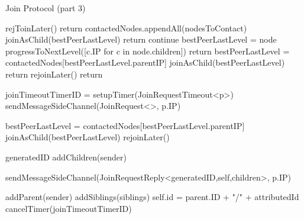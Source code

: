 \begin{algorithm}
\begin{algorithmic}[1]
\caption{Join Protocol (part 3)}
    
             
                \State rejToinLater()
                \State return
            \EndIf
        \EndIf
        \State contactedNodes.appendAll(nodesToContact)
                    \State joinAsChild(bestPeerLastLevel)
                    \State return
                \EndIf
            \EndIf
                \State continue 
            \EndIf
            \State bestPeerLastLevel = node
            \State progressToNextLevel([c.IP for c in node.children])
            \State return
                \State bestPeerLastLevel = contactedNodes[bestPeerLastLevel.parentIP]
                \State joinAsChild(bestPeerLastLevel)       
                \State return
            \Else
                \State rejoinLater()
                \State return
            \EndIf
        \EndFor
    \asdend
   
    \asdprocedure[joinAsChild(p)]
        \State joinTimeoutTimerID = setupTimer(JoinRequestTimeout<p>)
        \State sendMessageSideChannel(JoinRequest<>, p.IP)
    \asdend

    \asdupon[JoinRequestTimeout(p)]
            \State bestPeerLastLevel = contactedNodes[bestPeerLastLevel.parentIP]
            \State joinAsChild(bestPeerLastLevel)
        \Else
            \State rejoinLater()
        \EndIf
    \asdend

        \State generatedID \asdassign addChildren(sender) 

        \State sendMessageSideChannel(JoinRequestReply<generatedID,self,children>, p.IP)
    \asdend
        
        \State addParent(sender) 
        \State addSiblings(siblings) 
        \State self.id = parent.ID + "/" + attributedId
        \State cancelTimer(joinTimeoutTimerID)
    \asdend
\end{algorithmic}
\end{algorithm}
